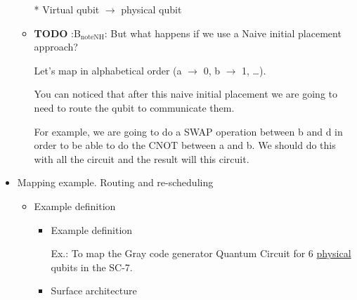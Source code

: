 \begin{itemize}
\begin{itemize}
\tiny{* Virtual qubit $\to$ physical qubit}




\item {\bfseries\sffamily TODO} :B\(_{\text{noteNH}}\):
\label{sec:org2db148d}
But what happens if we use a Naive initial placement approach?

Let's map in alphabetical order (a \(\to\) 0, b \(\to\) 1, \ldots{}).

You can noticed that after this naive initial placement we are going to need to route the qubit to communicate them.

For example, we are going to do a SWAP operation between b and d in order to be able to do the CNOT between a and b.
We should do this with all the circuit and the result will this circuit.
\end{itemize}


\item Mapping example. Routing and re-scheduling
\label{sec:orgfa8b241}
\begin{itemize}
\item Example definition
\label{sec:orgef961c2}
\begin{itemize}
\item Example definition
\label{sec:org0c1cc87}
\begin{center}

Ex.: To map the Gray code generator Quantum Circuit for 6 \uline{physical} qubits in the SC-7.

\end{center}

\item Surface architecture
\label{sec:org51da662}

    \begin{center}
\end{center}
\end{itemize}
\end{itemize}
\end{itemize}
